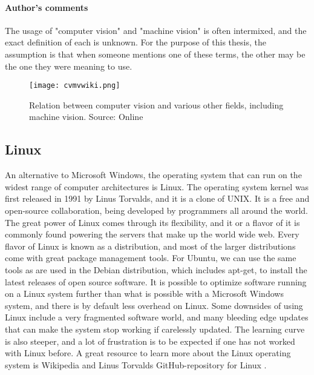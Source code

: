 \paragraph{Author's comments}
The usage of "computer vision" and "machine vision" is often intermixed, and the exact definition of each is unknown. For the purpose of this thesis, the assumption is that when someone mentions one of these terms, the other may be the one they were meaning to use.

\begin{figure}[ht]
    \centering
    \texttt{[image: cvmvwiki.png]}
    \caption{Relation between computer vision and various other fields, including machine vision. Source: Online \citet{cvmvwiki15}}
    \label{fig:cvmvwiki}
\end{figure}
\FloatBarrier

\subsection{Linux}
An alternative to Microsoft Windows, the operating system that can run on the widest range of computer architectures is Linux. The operating system kernel was first released in 1991 by Linus Torvalds, and it is a clone of UNIX.
It is a free and open-source collaboration, being developed by programmers all around the world.
The great power of Linux comes through its flexibility, and it or a flavor of it is commonly found powering the servers that make up the world wide web.
Every flavor of Linux is known as a distribution, and most of the larger distributions come with great package management tools.
For Ubuntu, we can use the same tools as are used in the Debian distribution, which includes apt-get, to install the latest releases of open source software.
It is possible to optimize software running on a Linux system further than what is possible with a Microsoft Windows system, and there is by default less overhead on Linux.
Some downsides of using Linux include a very fragmented software world, and many bleeding edge updates that can make the system stop working if carelessly updated. The learning curve is also steeper, and a lot of frustration is to be expected if one has not worked with Linux before.
A great resource to learn more about the Linux operating system is Wikipedia \citep{wikiLinux15} and Linus Torvalds GitHub-repository for Linux \citep{githubLinux15}.

